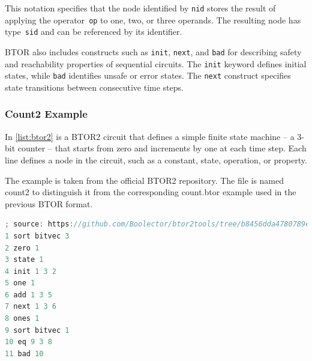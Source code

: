 This notation specifies that the node identified by \verb|nid| stores the result of applying the operator~\verb|op| to one, two, or three operands. The resulting node has type~\verb|sid| and can be referenced by its identifier.

{BTOR} also includes constructs such as \texttt{init}, \texttt{next}, and \texttt{bad} for describing safety and reachability properties of sequential circuits. The \texttt{init} keyword defines initial states, while \texttt{bad} identifies unsafe or error states. The \texttt{next} construct specifies state transitions between consecutive time steps.

\subsubsection{Count2 Example}

In \autoref{list:btor2} is a BTOR2 circuit that defines a simple finite state machine -- a 3-bit counter -- that starts from zero and increments by one at each time step. Each line defines a node in the circuit, such as a constant, state, operation, or property.

The example is taken from the official BTOR2 repository. The file is named count2 to distinguish it from the corresponding count.btor example used in the previous BTOR format.



\lstset{style=mystyle}
\begin{lstlisting}[language=Verilog, 
  caption=BTOR2 example,
  label={list:btor2}]
; source: https://github.com/Boolector/btor2tools/tree/b8456dda4780789e882f5791eb486f295ade4da4/examples/btorsim
1 sort bitvec 3
2 zero 1
3 state 1
4 init 1 3 2
5 one 1
6 add 1 3 5
7 next 1 3 6
8 ones 1
9 sort bitvec 1
10 eq 9 3 8
11 bad 10
\end{lstlisting}


